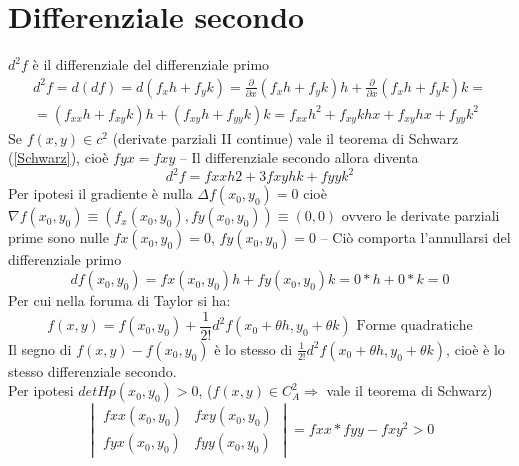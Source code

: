 \section{Differenziale secondo}
\begin{defi}
	$d^2f$ è il differenziale del differenziale primo
        \begin{equation*}
                \begin{matrix}
                        d^2f=d(df)= d(f_xh+f_yk)=\frac{\partial}{\partial x} (f_xh+f_yk)h+ 
                        \frac{\partial}{\partial x}(f_xh+f_yk)k=\\
                        =(f_{xx}h+f_{xy}k)h+ (f_{xy}h+f_{yy}k)k=f_{xx}h^2+f_{xy}k hx+ f_{xy}
                        hx+f_{yy} k^2
                \end{matrix}
         \end{equation*}
         Se $f(x,y)\in c^2$ (derivate parziali II continue) vale il teorema di Schwarz
         (\ref{Schwarz}), cioè $fyx=fxy$ -- Il differenziale secondo allora diventa
         \begin{equation*}
           d^2f=fxxh2+3fxy hk + fyy k^2
         \end{equation*}
         Per ipotesi il gradiente è nulla $\Delta f(x_0,y_0)=0$ cioè $\nabla f(x_0,y_0)\equiv (f_x(x_0,y_0),fy(x_0,y_0))\equiv (0,0)$ ovvero le derivate parziali prime sono nulle
         $fx(x_0,y_0)=0$, $fy(x_0,y_0)=0$ -- Ciò comporta l'annullarsi del differenziale primo
         \begin{equation*}
           df(x_0, y_0)=fx(x_0,y_0)h+fy(x_0,y_0)k=0*h+0*k=0
         \end{equation*}
         Per cui nella foruma di Taylor si ha:
         \begin{equation*}
           f(x,y)=f(x_0,y_0)+\frac{1}{2!}d^2f(x_0+\theta h, y_0+\theta k) \text{ Forme quadratiche}
         \end{equation*}
         Il segno di $f(x,y)-f(x_0,y_0)$ è lo stesso di $\frac{1}{2!}d^2f(x_0+\theta h,
         y_0+\theta k)$, cioè è lo stesso differenziale secondo.\\
         Per ipotesi $det Hp(x_0,y_0)>0$, ($f(x,y)\in C_A^2\Rightarrow$ vale il teorema di Schwarz)
         \begin{equation*}
           \begin{vmatrix}
             fxx(x_0,y_0) & fxy(x_0,y_0) \\
             fyx(x_0,y_0) & fyy(x_0,y_0) 
           \end{vmatrix}= fxx*fyy-fxy^2>0

\end{equation*}
\end{defi}

